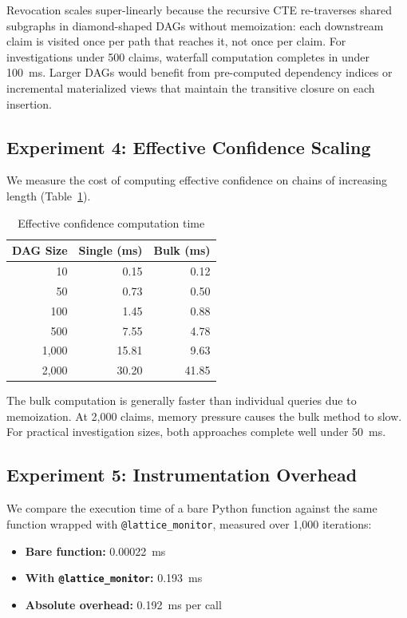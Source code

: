\documentclass[11pt,twocolumn]{article}
\begin{document}
Revocation scales super-linearly because the recursive CTE re-traverses shared subgraphs in diamond-shaped DAGs without memoization: each downstream claim is visited once per path that reaches it, not once per claim. For investigations under 500 claims, waterfall computation completes in under 100~ms. Larger DAGs would benefit from pre-computed dependency indices or incremental materialized views that maintain the transitive closure on each insertion.

\subsection{Experiment 4: Effective Confidence Scaling}

We measure the cost of computing effective confidence on chains of increasing length (Table~\ref{tab:effconf}).

\begin{table}[H]
\centering
\caption{Effective confidence computation time}
\label{tab:effconf}
\begin{tabular}{@{}rrr@{}}
\toprule
\textbf{DAG Size} & \textbf{Single (ms)} & \textbf{Bulk (ms)} \\
\midrule
10 & 0.15 & 0.12 \\
50 & 0.73 & 0.50 \\
100 & 1.45 & 0.88 \\
500 & 7.55 & 4.78 \\
1{,}000 & 15.81 & 9.63 \\
2{,}000 & 30.20 & 41.85 \\
\bottomrule
\end{tabular}
\end{table}

The bulk computation is generally faster than individual queries due to memoization. At 2{,}000 claims, memory pressure causes the bulk method to slow. For practical investigation sizes, both approaches complete well under 50~ms.

\subsection{Experiment 5: Instrumentation Overhead}

We compare the execution time of a bare Python function against the same function wrapped with \texttt{@lattice\_monitor}, measured over 1{,}000 iterations:

\begin{itemize}[leftmargin=*,itemsep=1pt]
\item \textbf{Bare function:} 0.00022~ms
\item \textbf{With \texttt{@lattice\_monitor}:} 0.193~ms
\item \textbf{Absolute overhead:} 0.192~ms per call
\end{itemize}
\end{document}
